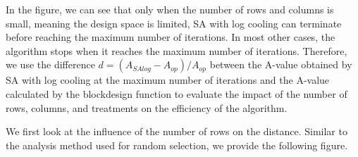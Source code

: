 \documentclass[
  a4paper,
  oneside,
  openany,
  12pt,
  onecolumn]{book}
\theoremstyle{plain}
\theoremstyle{definition}
\theoremstyle{remark}
\begin{document}
\begin{figure}


\caption{\label{fig-align}}

\end{figure}%

In the figure, we can see that only when the number of rows and columns
is small, meaning the design space is limited, SA with log cooling can
terminate before reaching the maximum number of iterations. In most
other cases, the algorithm stops when it reaches the maximum number of
iterations. Therefore, we use the difference
\(d = (A_{SAlog}-A_{op})/A_{op}\) between the A-value obtained by SA
with log cooling at the maximum number of iterations and the A-value
calculated by the blockdesign function to evaluate the impact of the
number of rows, columns, and treatments on the efficiency of the
algorithm.

We first look at the influence of the number of rows on the distance.
Similar to the analysis method used for random selection, we provide the
following figure.
\end{document}
